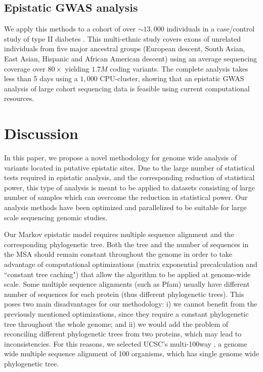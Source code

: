 \subsection{Epistatic GWAS analysis}

We apply this methods to a cohort of over $\sim 13,000$ individuals in a case/control study of type II diabetes \cite{mccarthy2015T2D}.
This multi-ethnic study covers exons of unrelated individuals from five major ancestral groups (European descent, South Asian, East Asian, Hispanic and African American descent) using an average sequencing coverage over $80 \times$ yielding $1.7M$ coding variants.
The complete analysis takes less than 5 days using a $1,000$ CPU-cluster, showing that an epistatic GWAS analysis of large cohort sequencing data is feasible using current computational resources.



\section{Discussion}

In this paper, we propose a novel methodology for genome wide analysis of variants located in putative epistatic sites. Due to the large number of statistical tests required in epistatic analysis, and the corresponding reduction of statistical power, this type of analysis is meant to be applied to datasets consisting of large number of samples which can overcome the reduction in statistical power. Our analysis methods have been optimized and parallelized to be suitable for large scale sequencing genomic studies.

Our Markov epistatic model requires multiple sequence alignment and the corresponding phylogenetic tree. Both the tree and the number of sequences in the MSA should remain constant throughout the genome in order to take advantage of computational optimizations (matrix exponential precalculation and “constant tree caching") that allow the algorithm to be applied at genome-wide scale. Some multiple sequence alignments (such as Pfam) usually have different number of sequences for each protein (thus different phylogenetic trees). This poses two main disadvantages for our methodology: i) we cannot benefit from the previously mentioned optimizations, since they require a constant phylogenetic tree throughout the whole genome; and ii) we would add the problem of reconciling different phylogenetic trees from two proteins, which may lead to inconsistencies. For this reasons, we selected UCSC's multi-100way \cite{karolchik2014ucsc}, a genome wide multiple sequence alignment of 100 organisms, which has single genome wide phylogenetic tree.

